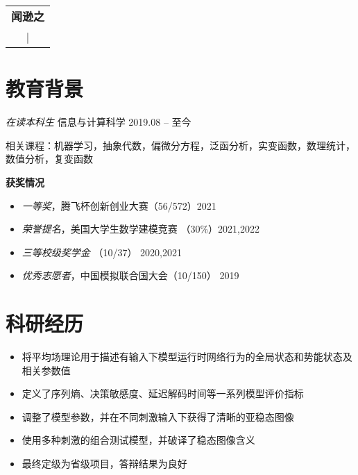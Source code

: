 \documentclass{resume}
\begin{document}
\begin{table}
  \centering
  \begin{tabu}{ c }
    \centering
    \textbf{\huge{闻逊之}}   \\
     |  \\
  \end{tabu}
\end{table}

\vspace{2pt}
\section{教育背景}
\textit{在读本科生} \quad 信息与计算科学 \hfill{2019.08 -- 至今}

相关课程：机器学习，抽象代数，偏微分方程，泛函分析，实变函数，数理统计，数值分析，复变函数

\textbf{获奖情况}
\begin{itemize}
  \item \textit{一等奖}，腾飞杯创新创业大赛（56/572）\hfill 2021
  \item \textit{荣誉提名}，美国大学生数学建模竞赛 （30\%）\hfill 2021,2022
  \item \textit{三等校级奖学金} （10/37） \hfill 2020,2021
  \item \textit{优秀志愿者}，中国模拟联合国大会（10/150） \hfill 2019
\end{itemize}

\section{科研经历}

\begin{itemize}
  \item 将平均场理论用于描述有输入下模型运行时网络行为的全局状态和势能状态及相关参数值
  \item 定义了序列熵、决策敏感度、延迟解码时间等一系列模型评价指标
  \item 调整了模型参数，并在不同刺激输入下获得了清晰的亚稳态图像
  \item 使用多种刺激的组合测试模型，并破译了稳态图像含义
  \item 最终定级为省级项目，答辩结果为良好
\end{itemize}
\end{document}
